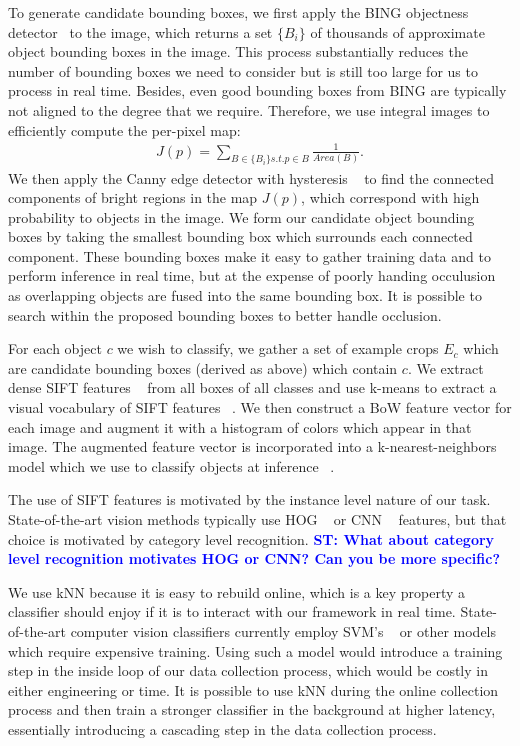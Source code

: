\documentclass[conference]{IEEEtran}
\newcommand{\stnote}[1]{\textcolor{Blue}{\textbf{ST: #1}}}
\begin{document}
To generate candidate bounding boxes, we first apply the BING
objectness detector~\citep{cheng14} to the image, which returns a set
$\{B_i\}$ of thousands of approximate object bounding boxes in the
image. This process substantially reduces the number of bounding boxes
we need to consider but is still too large for us to process in real
time. Besides, even good bounding boxes from BING are typically not
aligned to the degree that we require. Therefore, we use integral
images to efficiently compute the per-pixel map:
\begin{align}
J(p) = \sum_{B \in \{B_i\} s.t. p \in B} \frac{1}{Area(B)}.
\end{align}
We then apply the Canny edge detector with hysteresis ~\citep{} to find the connected components of bright
regions in the map $J(p)$, which correspond with high probability to objects in the image. We form
our candidate object bounding boxes by taking the smallest bounding box which surrounds each connected component.
These bounding boxes make it easy to gather training data and to perform inference in real time, but at
the expense of poorly handing occulusion as overlapping objects are fused into the same bounding box.
It is possible to search within the proposed bounding boxes to better handle occlusion.

For each object $c$ we wish to classify, we gather a set of example crops $E_c$ which are candidate
bounding boxes (derived as above) which contain $c$. We extract dense SIFT features ~\citep{} from all boxes of
all classes and use k-means to extract a visual vocabulary of SIFT features ~\citep{}. We then construct a
BoW feature vector for each image and augment it with a histogram of colors which appear in that image.
The augmented feature vector is incorporated into a k-nearest-neighbors model which we use to classify
objects at inference ~\citep{}.

The use of SIFT features is motivated by the instance level nature of our task. State-of-the-art vision
methods typically use HOG ~\citep{} or CNN ~\citep{} features, but that choice is motivated by category
level recognition. \stnote{What about category level recognition motivates HOG or CNN?  Can you be more specific?}

We use kNN because it is easy to rebuild online, which is a key property a classifier should enjoy
if it is to interact with our framework in real time. State-of-the-art computer vision classifiers
currently employ SVM's ~\citep{} or other models which require expensive training. Using such a model would
introduce a training step in the inside loop of our data collection process, which would be costly
in either engineering or time.  It is possible to use kNN during the online collection process and then
train a stronger classifier in the background at higher latency, essentially introducing a cascading step
in the data collection process.
\end{document}
